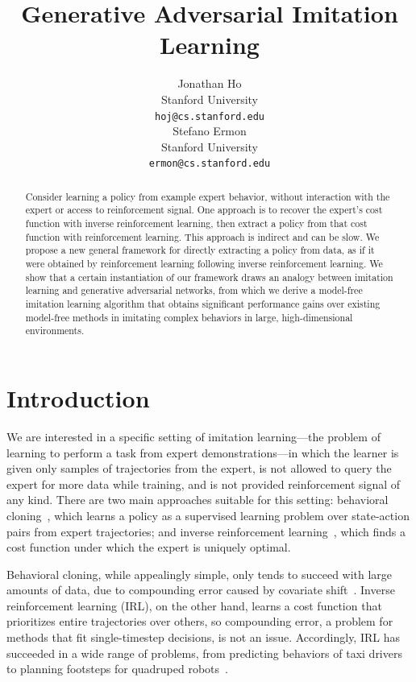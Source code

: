\documentclass{article}
\title{Generative Adversarial Imitation Learning}
\author{
  Jonathan Ho \\
  Stanford University \\
  \texttt{hoj@cs.stanford.edu} \\
  \And
  Stefano Ermon \\
  Stanford University \\
  \texttt{ermon@cs.stanford.edu}
}
\newcommand{\1}{\mathbb{I}} %
\begin{document}


\maketitle

\begin{abstract}
Consider learning a policy from example expert behavior, without interaction with the expert or access to reinforcement signal.
One approach is to recover the expert's cost function with inverse reinforcement learning, then extract a policy from that cost function with reinforcement learning.
This approach is indirect and can be slow.
We propose a new general framework for directly extracting a policy from data, as if it were obtained by reinforcement learning following inverse reinforcement learning.
We show that a certain instantiation of our framework draws an analogy between imitation learning and generative adversarial networks, from which we derive a model-free imitation learning algorithm that obtains significant performance gains over existing model-free  methods in imitating complex behaviors in large, high-dimensional environments.
\end{abstract}

\section{Introduction}
We are interested in a specific setting of imitation learning---the problem of learning to perform a task from expert demonstrations---in which the learner is given only samples of trajectories from the expert, is not allowed to query the expert for more data while training, and is not provided reinforcement signal of any kind.
There are two main approaches suitable for this setting: behavioral cloning~\citep{pomerleau1991efficient}, which learns a policy as a supervised learning problem over state-action pairs from expert trajectories; and inverse reinforcement learning~\citep{russell1998learning,ng2000algorithms}, which finds a cost function under which the expert is uniquely optimal.%

Behavioral cloning, while appealingly simple, only tends to succeed with large amounts of data, due to compounding error caused by covariate shift~\citep{ross2010efficient,ross2011reduction}.
Inverse reinforcement learning (IRL), on the other hand, learns a cost function that prioritizes entire trajectories over others, so compounding error, a problem for methods that fit single-timestep decisions, is not an issue.
Accordingly, IRL has succeeded in a wide range of problems, from predicting behaviors of taxi drivers~\citep{ziebart2008maximum} to planning footsteps for quadruped robots~\citep{ratliff2009learning}.
\end{document}
